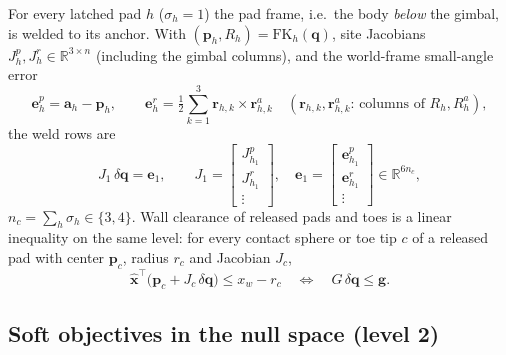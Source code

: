 \documentclass[11pt]{article}
\newcommand{\R}{\mathbb{R}}
\newcommand{\dq}{\delta\bm q}
\begin{document}
For every latched pad $h$ ($\sigma_h=1$) the pad frame, i.e.\ the body
\emph{below} the gimbal, is welded to its anchor. With
$(\bm p_h,R_h)=\mathrm{FK}_h(\bm q)$, site Jacobians $J^p_h,J^r_h\in\R^{3\times n}$
(including the gimbal columns), and the world-frame small-angle error
\begin{equation}
  \bm e^p_h=\bm a_h-\bm p_h,\qquad
  \bm e^r_h=\tfrac12\sum_{k=1}^{3}\bm r_{h,k}\times\bm r^a_{h,k}
  \quad(\bm r_{h,k},\bm r^a_{h,k}\text{: columns of }R_h,R^a_h),
\end{equation}
the weld rows are
\begin{equation}
  J_1\,\dq=\bm e_1,\qquad
  J_1=\begin{bmatrix}J^p_{h_1}\\ J^r_{h_1}\\ \vdots\end{bmatrix},\quad
  \bm e_1=\begin{bmatrix}\bm e^p_{h_1}\\ \bm e^r_{h_1}\\ \vdots\end{bmatrix}
  \in\R^{6n_c},
  \label{eq:weld}
\end{equation}
$n_c=\sum_h\sigma_h\in\{3,4\}$. Wall clearance of released pads and toes is
a linear inequality on the same level: for every contact sphere or toe tip
$c$ of a released pad with center $\bm p_c$, radius $r_c$ and Jacobian $J_c$,
\begin{equation}
  \hat{\bm x}^\top\bigl(\bm p_c+J_c\,\dq\bigr)\le x_w-r_c
  \quad\Longleftrightarrow\quad G\,\dq\le\bm g .
  \label{eq:clear}
\end{equation}

\subsection{Soft objectives in the null space (level 2)}
\label{sec:soft}
\end{document}
